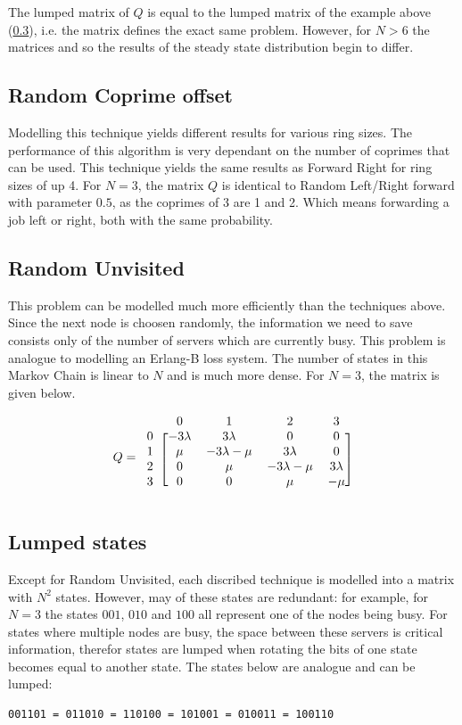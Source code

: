 \documentclass[10pt,a4paper,titlepage]{article}
\begin{document}
The lumped matrix of $Q$ is equal to the lumped matrix of the example above (\ref{lump}), i.e. the matrix defines the exact same problem. However, for $N > 6$ the matrices and so the results of the steady state distribution begin to differ.


\subsection{Random Coprime offset}
Modelling this technique yields different results for various ring sizes. The performance of this algorithm is very dependant on the number of coprimes that can be used. This technique yields the same results as Forward Right for ring sizes of up 4. For $N = 3$, the matrix $Q$ is identical to Random Left/Right forward with parameter $0.5$, as the coprimes of 3 are 1 and 2. Which means forwarding a job left or right, both with the same probability.


\subsection{Random Unvisited}
This problem can be modelled much more efficiently than the techniques above. Since the next node is choosen randomly, the information we need to save consists only of the number of servers which are currently busy. This problem is analogue to modelling an Erlang-B loss system. The number of states in this Markov Chain is linear to $N$ and is much more dense. For $N=3$, the matrix is given below.

\[ Q =
  \begin{blockarray}{ccccc}
    & 0 & 1 & 2 & 3 \\
    \begin{block}{c[cccc]}
    0 & -3\lambda & 3\lambda & 0 & 0 \\
    1 & \mu & -3\lambda-\mu & 3\lambda & 0 \\
    2 & 0 & \mu & -3\lambda-\mu & 3\lambda \\
    3 & 0 & 0 & \mu & -\mu \\
    \end{block}
  \end{blockarray}
\]

\subsection{Lumped states}
\label{lump}

Except for Random Unvisited, each discribed technique is modelled into a matrix with $N^2$ states. However, may of these states are redundant: for example, for $N=3$ the states $001$, $010$ and $100$ all represent one of the nodes being busy. For states where multiple nodes are busy, the space between these servers is critical information, therefor states are lumped when rotating the bits of one state becomes equal to another state. The states below are analogue and can be lumped:
\begin{verbatim}
001101 = 011010 = 110100 = 101001 = 010011 = 100110
\end{verbatim}
\end{document}
